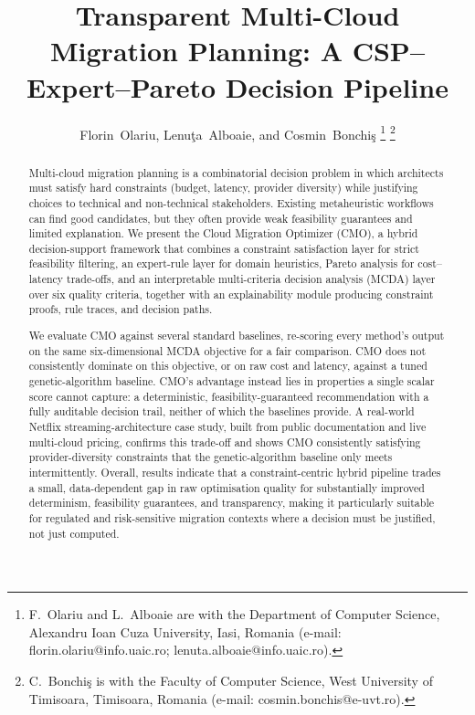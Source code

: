 \documentclass[journal]{IEEEtran}
\newcommand{\cmo}{CMO\xspace}
\begin{document}
\title{Transparent Multi-Cloud Migration Planning: A CSP--Expert--Pareto
  Decision Pipeline}

\author{Florin~Olariu, Lenu\c{t}a~Alboaie, and Cosmin~Bonchi\c{s}%
  \thanks{F.~Olariu and L.~Alboaie are with the Department of Computer Science,
  Alexandru Ioan Cuza University, Iasi, Romania
  (e-mail: florin.olariu@info.uaic.ro; lenuta.alboaie@info.uaic.ro).}%
  \thanks{C.~Bonchi\c{s} is with the Faculty of Computer Science, West
  University of Timisoara, Timisoara, Romania
  (e-mail: cosmin.bonchis@e-uvt.ro).}}

\maketitle

\begin{abstract}
Multi-cloud migration planning is a combinatorial decision problem in which
architects must satisfy hard constraints (budget, latency, provider
diversity) while justifying choices to technical and non-technical
stakeholders. Existing metaheuristic workflows can find good candidates, but
they often provide weak feasibility guarantees and limited explanation. We
present the Cloud Migration Optimizer (\cmo), a hybrid decision-support
framework that combines a constraint satisfaction layer for strict
feasibility filtering, an expert-rule layer for domain heuristics, Pareto
analysis for cost--latency trade-offs, and an interpretable multi-criteria
decision analysis (MCDA) layer over six quality criteria, together with an
explainability module producing constraint proofs, rule traces, and decision
paths.

We evaluate \cmo against several standard baselines, re-scoring every
method's output on the same six-dimensional MCDA objective for a fair
comparison. \cmo does not consistently dominate on this objective, or on raw
cost and latency, against a tuned genetic-algorithm baseline. \cmo's
advantage instead lies in properties a single scalar score cannot capture: a
deterministic, feasibility-guaranteed recommendation with a fully auditable
decision trail, neither of which the baselines provide. A real-world Netflix
streaming-architecture case study, built from public documentation and live
multi-cloud pricing, confirms this trade-off and shows \cmo consistently
satisfying provider-diversity constraints that the genetic-algorithm
baseline only meets intermittently. Overall, results indicate that a
constraint-centric hybrid pipeline trades a small, data-dependent gap in raw
optimisation quality for substantially improved determinism, feasibility
guarantees, and transparency, making it particularly suitable for regulated
and risk-sensitive migration contexts where a decision must be justified,
not just computed.
\end{abstract}
\end{document}
